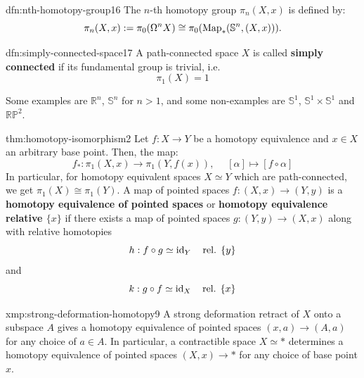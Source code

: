 \documentclass[landscape, 8pt]{extarticle}
\begin{document}
\begin{multicols*}{3}
\begin{dfn}{dfn:nth-homotopy-group}{16}
	The $n$-th homotopy group $\pi_{n}(X, x)$ is defined by:
	\[\pi_{n}(X, x) := \pi_{0}(\Omega^{n} X) \cong \pi_{0}(\operatorname{Map}_{\ast}(\mathbb{S}^{n}, (X, x))).\]
\end{dfn}

\vspace{-7pt}
\begin{dfn}{dfn:simply-connected-space}{17}
	A path-connected space $X$ is called \textbf{simply connected} if its fundamental group is trivial, i.e.
	\vspace{-4pt}
	\[\pi_{1}(X) = 1\]
	\par\vspace{-4pt}
	\tcbline
	Some examples are $\mathbb{R}^{n}$, $\mathbb{S}^{n}$ for $n > 1$, and some non-examples are $\mathbb{S}^{1}$, $\mathbb{S}^{1} \times \mathbb{S}^{1}$ and $\mathbb{RP}^{2}$.
\end{dfn}

\vspace{-7pt}
\begin{thm}{thm:homotopy-isomorphism}{2}
	Let $f : X \to Y$ be a homotopy equivalence and $x\in X$ an arbitrary base point. Then, the map:
	\[f_{\ast} : \pi_{1}(X, x) \to \pi_{1}(Y, f(x)),\;\quad [\alpha] \mapsto [f \circ \alpha]\]
	In particular, for homotopy equivalent spaces $X \simeq Y$ which are path-connected, we get $\pi_{1}(X) \cong \pi_{1}(Y)$.
	\tcbline
	A map of pointed spaces $f : (X, x) \to (Y, y)$ is a \textbf{homotopy equivalence of pointed spaces} or \textbf{homotopy equivalence relative $\{x\}$} if there exists a map of pointed spaces $g : (Y, y) \to (X, x)$ along with relative homotopies
	\[h : f \circ g \simeq \operatorname{id}_{Y} \quad \text{rel. } \{y\}\]
	and
	\[k : g \circ f \simeq \operatorname{id}_{X} \quad \text{rel. } \{x\}\]
\end{thm}

\vspace{-7pt}
\begin{xmp}{xmp:strong-deformation-homotopy}{9}
	A strong deformation retract of $X$ onto a subspace $A$ gives a homotopy equivalence of pointed spaces $(x, a) \to (A, a)$ for any choice of $a\in A$. In particular, a contractible space $X \simeq \ast$ determines a homotopy equivalence of pointed spaces $(X, x) \to \ast$ for any choice of base point $x$.
\end{xmp}


\end{multicols*}
\end{document}

